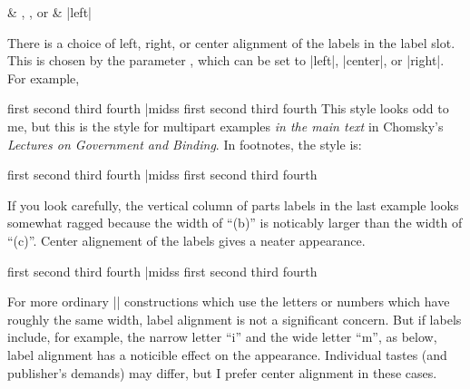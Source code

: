 \begininventory
\parameter\cr
{}& , , or
&
   \hfil |left|\cr
\endinventory

\noindent There is a choice of left, right, or center alignment of the
labels in the label slot.  This is chosen by the parameter
, which can be set to |left|, |center|, or |right|.
For example,

\beginss
\pex[exno=43,labeltype=roman,
   labelformat=(A),labelalign=right,
   samplelabel=(iii)]
\a first
\a second
\a third
\a fourth
\xe|midss
\pex[exno=43,labeltype=roman,
   labelformat=(A),labelalign=right,
   samplelabel=(iii)]
\a first
\a second
\a third
\a fourth
\xe
\endss
This style looks odd to me, but this is the style for multipart examples
{\it in the main text\/} in Chomsky's {\it Lectures on Government
and Binding}.  In footnotes, the style is:

\beginss
\pex[exno=i,labeltype=alpha,
   samplelabel=(a),labelformat=(A)]
\a first
\a second
\a third
\a fourth
\xe|midss
\pex[exno=i,labeltype=alpha,
   samplelabel=(a),labelformat=(A)]
\a first
\a second
\a third
\a fourth
\xe
\endss

If you look carefully, the vertical column of parts labels in the last
example looks somewhat ragged because the width of ``(b)'' is
noticably larger than the width of ``(c)''.  Center alignement of the
labels gives a neater appearance.

\beginss
\pex[exno=i,labeltype=alpha,
   samplelabel=(a),labelformat=(A),
   labelalign=center]
\a first
\a second
\a third
\a fourth
\xe|midss
\pex[exno=i,labeltype=alpha,
   samplelabel=(a),labelformat=(A),
   labelalign=center]
\a first
\a second
\a third
\a fourth
\xe
\endss

For more ordinary |\pex| constructions which use the letters or
numbers which have roughly the same width, label alignment is not
a significant concern.  But if labels include, for example, the
narrow letter ``i'' and the wide letter ``m'', as below, label
alignment has a noticible effect on the appearance.  Individual
tastes (and publisher's demands) may differ, but I prefer center
alignment in these cases.


